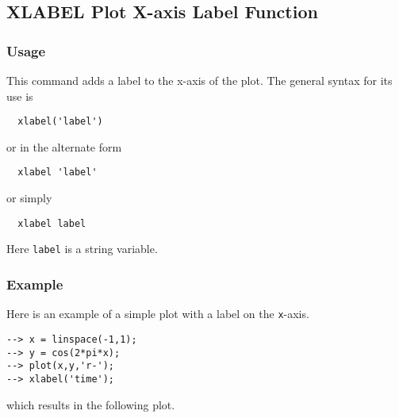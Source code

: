 %
%
%
\subsection{XLABEL Plot X-axis Label Function}
\subsubsection{Usage}
This command adds a label to the x-axis of the plot.  The general syntax
for its use is
\begin{verbatim}
  xlabel('label')
\end{verbatim}
or in the alternate form
\begin{verbatim}
  xlabel 'label'
\end{verbatim}
or simply
\begin{verbatim}
  xlabel label
\end{verbatim}
Here \verb|label| is a string variable.
\subsubsection{Example}
Here is an example of a simple plot with a label on the \verb|x|-axis.
\begin{verbatim}
--> x = linspace(-1,1);
--> y = cos(2*pi*x);
--> plot(x,y,'r-');
--> xlabel('time');
\end{verbatim}
which results in the following plot.

